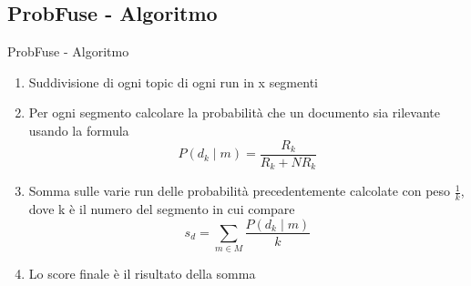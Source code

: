 \subsection{ProbFuse - Algoritmo}
\begin{frame}{ProbFuse - Algoritmo}
	\begin{enumerate}
		\item Suddivisione di ogni topic di ogni run in x segmenti
		\item Per ogni segmento calcolare la probabilità che un documento sia rilevante usando la formula
			\[P(d_k\mid m)=\frac{R_k}{R_k+NR_k}\]
		\item Somma sulle varie run delle probabilità precedentemente calcolate con peso $\frac{1}{k}$, dove k è il numero del segmento in cui compare
			\[s_d=\sum_{m\in M}\frac{P(d_k\mid m)}{k}\]
		\item Lo score finale è il risultato della somma
	\end{enumerate}
\end{frame}